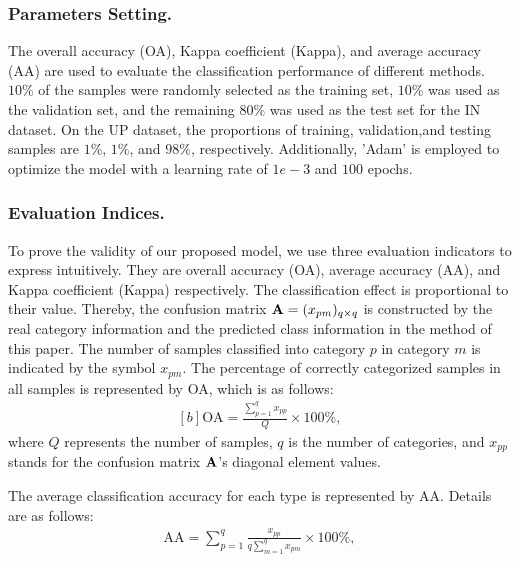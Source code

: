 \documentclass[]{interact}
\theoremstyle{plain}%
\theoremstyle{definition}
\theoremstyle{remark}
\begin{document}
\subsubsection{Parameters Setting.}

The overall accuracy (OA), Kappa coefficient (Kappa), and average accuracy (AA) are used to evaluate the classification performance of different methods. $10\% $ of the samples were randomly selected as the training set, $10\% $ was used as the validation set, and the remaining $80\% $ was used as the test set for the IN dataset. On the UP dataset, the proportions of training, validation,and testing samples are $1\% $, $1\% $, and $98\% $, respectively. Additionally, 'Adam' \citep{kingma2014adam} is employed to optimize the model with a learning rate of $1e-3$ and $100$ epochs.

\subsubsection{Evaluation Indices.} To prove the validity of our proposed model, we use three evaluation indicators \citep{richards2013remote} to express intuitively. They are overall accuracy (OA), average accuracy (AA), and Kappa coefficient (Kappa) respectively. The classification effect is proportional to their value. Thereby, the confusion matrix ${\bf A} = (x_{pm})_{q \times q}$ is constructed by the real category information and the predicted class information in the method of this paper. The number of samples classified into category $p$ in category $m$ is indicated by the symbol $x_{pm}$. The percentage of correctly categorized samples in all samples is represented by OA, which is as follows:
\begin{equation}\label{eq:12}
\begin{aligned}[b]
\textrm{OA} =\frac{\sum_{p=1}^q x_{pp}}{Q}\times 100\%,
\end{aligned}
\end{equation}
where $Q$ represents the number of samples, $q$ is the number of categories, and $x_{pp}$ stands for the confusion matrix ${\bf A}$'s diagonal element values.

The average classification accuracy for each type is represented by AA. Details are as follows:
\begin{equation}\label{eq:13}
\begin{aligned}
\textrm{AA} = \sum_{p=1}^q \frac{x_{pp}}{q \sum_{m=1}^q x_{pm}}\times 100\%,
\end{aligned}
\end{equation}
\end{document}
